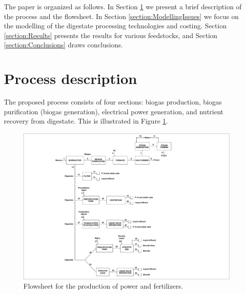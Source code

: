 \begin{refsection}[referencesCh2]
The paper is organized as follows. In Section \ref{section:ProcessDescription} we present a brief description of the process and the flowsheet. In Section \ref{section:ModellingIssues} we focus on the modelling of the digestate processing technologies and costing. Section \ref{section:Results} presents the results for various feedstocks, and Section \ref{section:Conclusions} draws conclusions.

\section{Process description} \label{section:ProcessDescription}
The proposed process consists of four sections: biogas production, biogas purification (biogas generation), electrical power generation, and nutrient recovery from digestate. This is illustrated in Figure \ref{fig:Flowsheet}.

\begin{figure}[h!]
	\centering
	\includegraphics[width=1\linewidth, trim={6.5cm 0.1cm 11.5cm 0.3cm},clip]{gfx/Chapter2/superstructure3bloquesCOMPATIBILIDAD-Layout3.pdf} 
	\caption{Flowsheet for the production of power and fertilizers.}
	\label{fig:Flowsheet}
\end{figure}


\end{refsection}
